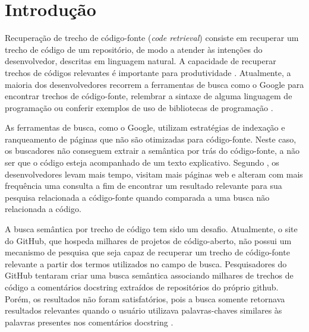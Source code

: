 \chapter{Introdução}
\label{cap:introducao}


Recuperação de trecho de código-fonte (\textit{code retrieval}) consiste em recuperar um trecho de código de um repositório, de modo a atender às intenções do desenvolvedor, descritas em linguagem natural. A capacidade de recuperar trechos de códigos relevantes é importante para produtividade \citep{sadowski-how-developers-search-for-code-case-study:2015}. Atualmente, a maioria dos desenvolvedores recorrem a ferramentas de busca como o Google para encontrar trechos de código-fonte, relembrar a sintaxe de alguma linguagem de programação ou conferir exemplos de uso de bibliotecas de programação \citep{masudur-developers-use-google-code-retrieval:2018}.

As ferramentas de busca, como o Google, utilizam estratégias de indexação e ranqueamento de páginas que não são otimizadas para código-fonte. Neste caso, os buscadores não conseguem extrair a semântica por trás do código-fonte, a não ser que o código esteja acompanhado de um texto explicativo. Segundo \cite{masudur-developers-use-google-code-retrieval:2018}, os desenvolvedores levam mais tempo, visitam mais páginas web e alteram com mais frequência uma consulta a fim de encontrar um resultado relevante para sua pesquisa relacionada a código-fonte quando comparada a uma busca não relacionada a código.


A busca semântica por trecho de código tem sido um desafio. Atualmente, o site do GitHub, que hospeda milhares de projetos de código-aberto, não possui um mecanismo de pesquisa que
seja capaz de recuperar um trecho de código-fonte relevante a partir dos termos utilizados no campo de busca. Pesquisadores do GitHub tentaram criar uma busca semântica associando milhares de trechos de código a comentários \gls{docstring} extraídos de repositórios do próprio \Gls{github}. Porém, os resultados não foram satisfatórios, pois a busca somente retornava resultados relevantes quando o usuário utilizava palavras-chaves similares às palavras presentes nos comentários \gls{docstring} \citep{husain-github-semantic-search-code-2019}. 


